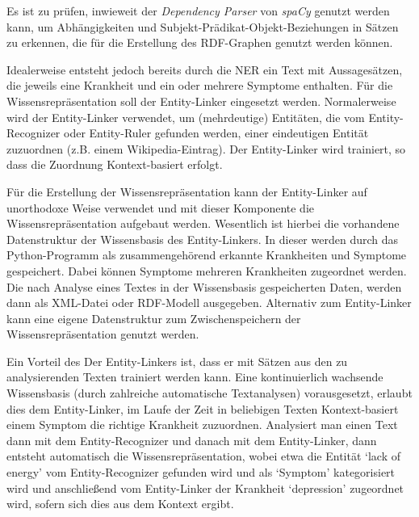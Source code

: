 Es ist zu prüfen, inwieweit der \emph{Dependency Parser} von \emph{spaCy} genutzt werden kann, um Abhängigkeiten und Subjekt-Prädikat-Objekt-Beziehungen in Sätzen zu erkennen, die für die Erstellung des RDF-Graphen genutzt werden können.

Idealerweise entsteht jedoch bereits durch die NER ein Text mit Aussagesätzen, die jeweils eine Krankheit und ein oder mehrere Symptome enthalten. Für die Wissensrepräsentation soll der Entity-Linker eingesetzt werden. Normalerweise wird der Entity-Linker verwendet, um (mehrdeutige) Entitäten, die vom Entity-Recognizer oder Entity-Ruler gefunden werden, einer eindeutigen Entität zuzuordnen (z.B. einem Wikipedia-Eintrag). Der Entity-Linker wird trainiert, so dass die Zuordnung Kontext-basiert erfolgt.

Für die Erstellung der Wissensrepräsentation kann der Entity-Linker auf unorthodoxe Weise verwendet und mit dieser Komponente die Wissensrepräsentation aufgebaut werden. Wesentlich ist hierbei die vorhandene Datenstruktur der Wissensbasis des Entity-Linkers. In dieser werden durch das Python-Programm als zusammengehörend erkannte Krankheiten und Symptome gespeichert. Dabei können Symptome mehreren Krankheiten zugeordnet werden. Die nach Analyse eines Textes in der Wissensbasis gespeicherten Daten, werden dann als XML-Datei oder RDF-Modell ausgegeben. Alternativ zum Entity-Linker kann eine eigene Datenstruktur zum Zwischenspeichern der Wissensrepräsentation genutzt werden.

Ein Vorteil des Der Entity-Linkers ist, dass er mit Sätzen aus den zu analysierenden Texten trainiert werden kann. Eine kontinuierlich wachsende Wissensbasis (durch zahlreiche automatische Textanalysen) vorausgesetzt, erlaubt dies dem Entity-Linker, im Laufe der Zeit in beliebigen Texten Kontext-basiert einem Symptom die richtige Krankheit zuzuordnen. Analysiert man einen Text dann mit dem Entity-Recognizer und danach mit dem Entity-Linker, dann entsteht automatisch die Wissensrepräsentation, wobei etwa die Entität `lack of energy' vom Entity-Recognizer gefunden wird und als `Symptom' kategorisiert wird und anschließend vom Entity-Linker der Krankheit `depression' zugeordnet wird, sofern sich dies aus dem Kontext ergibt.

\vspace{1cm}

